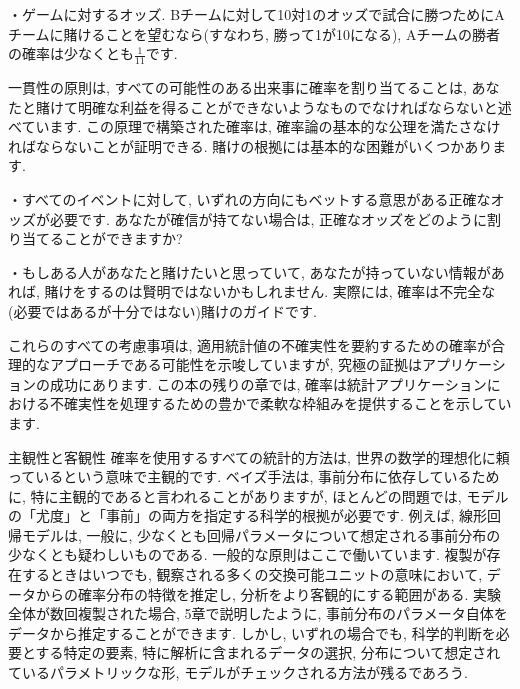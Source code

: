 \documentclass[10pt,dvipdfmx,a4]{beamer}
\begin{document}
\begin{frame}
・ゲームに対するオッズ.
Bチームに対して10対1のオッズで試合に勝つためにAチームに賭けることを望むなら(すなわち, 勝って1が10になる), Aチームの勝者の確率は少なくとも$\tfrac{1}{11}$です.

一貫性の原則は, すべての可能性のある出来事に確率を割り当てることは, あなたと賭けて明確な利益を得ることができないようなものでなければならないと述べています.
この原理で構築された確率は, 確率論の基本的な公理を満たさなければならないことが証明できる.
賭けの根拠には基本的な困難がいくつかあります.

・すべてのイベントに対して, いずれの方向にもベットする意思がある正確なオッズが必要です.
あなたが確信が持てない場合は, 正確なオッズをどのように割り当てることができますか?

・もしある人があなたと賭けたいと思っていて, あなたが持っていない情報があれば, 賭けをするのは賢明ではないかもしれません.
実際には, 確率は不完全な(必要ではあるが十分ではない)賭けのガイドです.

これらのすべての考慮事項は, 適用統計値の不確実性を要約するための確率が合理的なアプローチである可能性を示唆していますが, 究極の証拠はアプリケーションの成功にあります.
この本の残りの章では, 確率は統計アプリケーションにおける不確実性を処理するための豊かで柔軟な枠組みを提供することを示しています.
\end{frame}


\begin{frame}{主観性と客観性}
確率を使用するすべての統計的方法は, 世界の数学的理想化に頼っているという意味で主観的です.
ベイズ手法は, 事前分布に依存しているために, 特に主観的であると言われることがありますが, ほとんどの問題では, モデルの「尤度」と「事前」の両方を指定する科学的根拠が必要です.
例えば, 線形回帰モデルは, 一般に, 少なくとも回帰パラメータについて想定される事前分布の少なくとも疑わしいものである.
一般的な原則はここで働いています.
複製が存在するときはいつでも, 観察される多くの交換可能ユニットの意味において, データからの確率分布の特徴を推定し, 分析をより客観的にする範囲がある.
実験全体が数回複製された場合, 5章で説明したように, 事前分布のパラメータ自体をデータから推定することができます.
しかし, いずれの場合でも, 科学的判断を必要とする特定の要素, 特に解析に含まれるデータの選択, 分布について想定されているパラメトリックな形, モデルがチェックされる方法が残るであろう.
\end{frame}

\end{document}
